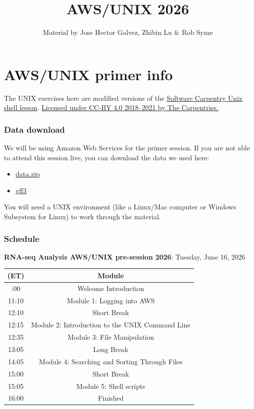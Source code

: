 \documentclass[
]{book}
\title{AWS/UNIX 2026}
\author{Material by Jose Hector Galvez, Zhibin Lu \& Rob Syme}
\date{}
\providecommand{\tightlist}{%
  \setlength{\itemsep}{0pt}\setlength{\parskip}{0pt}}
\begin{document}
\maketitle

{
\setcounter{tocdepth}{1}
\tableofcontents
}
\chapter{AWS/UNIX primer info}\label{awsunix-primer-info}

The UNIX exercises here are modified versions of the \href{https://swcarpentry.github.io/shell-novice/}{Software Carpentry Unix shell lesson}. \href{https://carpentries.org/}{Licensed under CC-BY 4.0 2018--2021 by The Carpentries.}

\subsection{Data download}\label{data-download}

We will be using Amazon Web Services for the primer session. If you are not able to attend this session live, you can download the data we used here:

\begin{itemize}
\tightlist
\item
  \href{https://drive.google.com/file/d/1Rckn6rUl9Tv1XnUcG7MvcAztqhqqCIs-/view?usp=drive_link}{data.zip}
\item
  \href{https://drive.google.com/file/d/1GX4LZlIkXiRQqOZD6Tq30eErSZ3Dgd6n/view?usp=drive_link}{gff3}
\end{itemize}

You will need a UNIX environment (like a Linux/Mac computer or Windows Subsystem for Linux) to work through the material.

\subsection{Schedule}\label{schedule}

\textbf{RNA-seq Analysis AWS/UNIX pre-session 2026}: Tuesday, June 16, 2026

\begin{longtable}[]{@{}cc@{}}
\toprule\noalign{}
(ET) & Module \\
\midrule\noalign{}
\endhead
\bottomrule\noalign{}
\endlastfoot
11:00 & Welcome Introduction \\
11:10 & Module 1: Logging into AWS \\
12:10 & Short Break \\
12:15 & Module 2: Introduction to the UNIX Command Line \\
12:35 & Module 3: File Manipulation \\
13:05 & Long Break \\
14:05 & Module 4: Searching and Sorting Through Files \\
15:00 & Short Break \\
15:05 & Module 5: Shell scripts \\
16:00 & Finished \\
\end{longtable}
\end{document}
